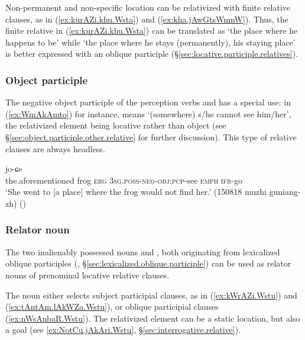 Non-permanent and non-specific location can be relativized with finite relative clauses, as in (\ref{ex:kurAZi.khu.Wsta}) and (\ref{ex:kha.jAwGtsWmnW}). Thus, the finite relative  in (\ref{ex:kurAZi.khu.Wsta}) can be translated as `the place where he happens to be' while `the place where he stays (permanently), his staying place' is better expressed with an oblique participle  (§\ref{sec:locative.participle.relatives}).
 
\subsubsection{Object participle} \label{sec:locative.relativization.object}
The negative object participle of the perception verbs  and  has a special use: in (\ref{ex:WmAkAmto}) for instance,  means `(somewhere) s/he cannot see him/her', the relativized element being locative rather than object  (see §\ref{sec:object.participle.other.relative} for further discussion). This type of relative clauses are always headless.

\begin{exe}
\ex \label{ex:WmAkAmto}
 jo-ɕe  \\
the.aforementioned frog \textsc{erg} \textsc{3sg}.\textsc{poss}-\textsc{neg}-\textsc{obj}:\textsc{pcp}-see \textsc{emph} \textsc{ifr}-go   \\
\glt `She went to [a place] where the frog would not find her.' (150818 muzhi guniang-zh)
()
\end{exe}

\subsubsection{Relator noun} \label{sec:Wstu.relativization.subject}
The two inalienably possessed nouns   and , both originating from lexicalized oblique participles (, §\ref{sec:lexicalized.oblique.participle}) can be used as relator nouns of prenominal locative relative clauses.

The noun  either selects subject participial clauses, as in (\ref{ex:kWrAZi.Wstu}) and (\ref{ex:tAntAm.lAkWZa.Wstu}), or oblique participial clauses (\ref{ex:nWsAnbaR.Wstu}). The relativized element can be a static location, but also a goal (see \ref{ex:NotCu.jAkAri.Wstu}, §\ref{sec:interrogative.relative}).
 
